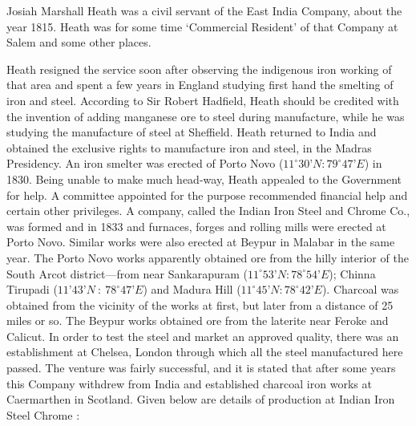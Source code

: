 Josiah Marshall Heath was a civil servant of the East India Company, about the year 1815.  Heath was for some time `Commercial Resident' of that Company at Salem and some other places.


Heath resigned the service soon after observing the indigenous iron working of that area and spent a few years in England studying first hand the smelting of iron and steel. According to Sir Robert Hadfield, Heath should be credited with the invention of adding manganese ore to steel during manufacture, while he was studying the manufacture of steel at Sheffield. Heath returned to India and obtained the exclusive rights to manufacture iron and steel, in the Madras Presidency. An iron smelter was erected of Porto Novo ($11^\circ 30’N:79^\circ 47’E$) in 1830. Being unable to make much head-way, Heath appealed to the Government for help. A committee appointed for the purpose recommended financial help and certain other privileges. A company, called the Indian Iron Steel and Chrome Co., was formed and in 1833 and furnaces, forges and rolling mills were erected at Porto Novo. Similar works were also erected at Beypur in Malabar in the same year. The Porto Novo works apparently obtained ore from the hilly interior of the South Arcot district—from near Sankarapuram ($11^\circ 53’N: 78^\circ 54’E$); Chinna Tirupadi ($11’ 43’N~:~78^\circ 47’E$) and Madura Hill ($11^\circ 45’N: 78^\circ 42’E$). Charcoal was obtained from the vicinity of the works at first, but later from a distance of 25 miles or so. The Beypur works obtained ore from the laterite near Feroke and Calicut. In order to test the steel and market an approved quality, there was an establishment at Chelsea, London through which all the steel manufactured here passed. The venture was fairly successful, and it is stated that after some years this Company withdrew from India and established charcoal iron works at Caermarthen in Scotland. Given below are details of production at Indian Iron Steel Chrome :

